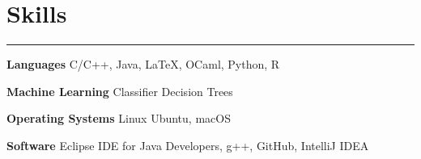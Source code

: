\documentclass[10pt]{article}
\newcommand{\resumesection}[1]{\vspace{-0.2cm}\section*{#1}\vspace{-0.2cm}\hrule\vspace{0.2cm}}
\begin{document}
\resumesection{Skills}
\textbf{Languages} C/C++, Java, LaTeX, OCaml, Python, R

\textbf{Machine Learning} Classifier Decision Trees

\textbf{Operating Systems} Linux Ubuntu, macOS

\textbf{Software} Eclipse IDE for Java Developers, g++, GitHub, IntelliJ IDEA


%
\end{document}
